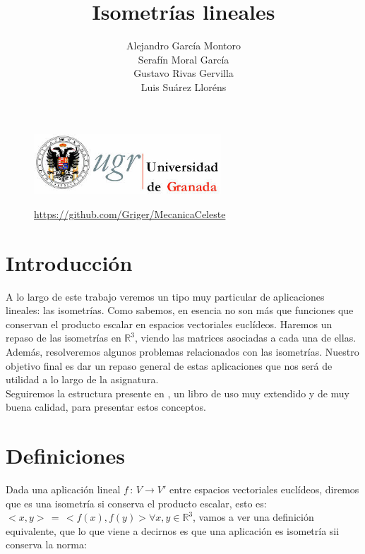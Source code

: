 \documentclass[10pt,a4paper]{article}
\author{Alejandro García Montoro \\ Serafín Moral García \\ Gustavo Rivas Gervilla \\ Luis Suárez Lloréns}
\title{Isometrías lineales}
\date{}
\theoremstyle{mystyle}
\begin{document}
\maketitle

\begin{figure}[H]
\centering
\includegraphics[width=70mm]{escudo.jpeg}
\end{figure}

\begin{figure}
\centering
\url{https://github.com/Griger/MecanicaCeleste}
\end{figure}

\newpage

\tableofcontents

\newpage

\section{Introducción}

A lo largo de este trabajo veremos un tipo muy particular de aplicaciones lineales: las isometrías. Como sabemos, en esencia no son más que funciones que conservan el producto escalar en espacios vectoriales euclídeos. Haremos un repaso de las isometrías en $\mathbb{R}^3$, viendo las matrices asociadas a cada una de ellas.\\

Además, resolveremos algunos problemas relacionados con las isometrías. Nuestro objetivo final es dar un repaso general de estas aplicaciones que nos será de utilidad a lo largo de la asignatura.\\

Seguiremos la estructura presente en \cite{merino}, un libro de uso muy extendido y de muy buena calidad, para presentar estos conceptos.

\section{Definiciones}

Dada una aplicación lineal $f \, : \, V \to V'$ entre espacios vectoriales euclídeos, diremos que es una isometría si conserva el producto escalar, esto es: $<x,y> \,  = \, <f(x),f(y)> \forall x,y \in \mathbb{R}^3$, vamos a ver una definición equivalente, que lo que viene a decirnos es que una aplicación es isometría sii conserva la norma:\\
\end{document}
